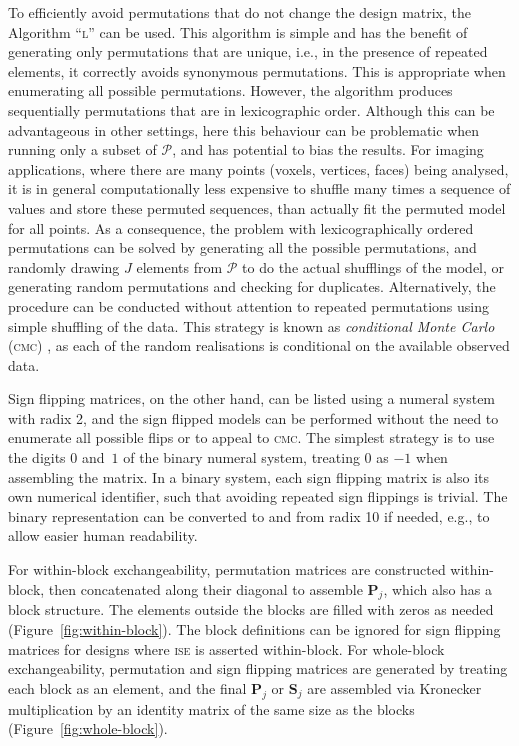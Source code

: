 To efficiently avoid permutations that do not change the design matrix, the Algorithm ``\textsc{l}'' \citep{Knuth2005} can be used. This algorithm is simple and has the benefit of generating only permutations that are unique, i.e., in the presence of repeated elements, it correctly avoids synonymous permutations. This is appropriate when enumerating all possible permutations. However, the algorithm produces sequentially permutations that are in lexicographic order. Although this can be advantageous in other settings, here this behaviour can be problematic when running only a subset of $\mathcal{P}$, and has potential to bias the results. For imaging applications, where there are many points (voxels, vertices, faces) being analysed, it is in general computationally less expensive to shuffle many times a sequence of values and store these permuted sequences, than actually fit the permuted model for all points. As a consequence, the problem with lexicographically ordered permutations can be solved by generating all the possible permutations, and randomly drawing $J$ elements from $\mathcal{P}$ to do the actual shufflings of the model,  or generating random permutations and checking for duplicates. Alternatively, the procedure can be conducted without attention to repeated permutations using simple shuffling of the data. This strategy is known as \emph{conditional Monte Carlo} (\textsc{cmc}) \citep{Trotter1956, Pesarin2010}, as each of the random realisations is conditional on the available observed data.

Sign flipping matrices, on the other hand, can be listed using a numeral system with radix 2, and the sign flipped models can be performed without the need to enumerate all possible flips or to appeal to \textsc{cmc}. The simplest strategy is to use the digits $0$ and~$1$ of the binary numeral system, treating 0 as $-1$ when assembling the matrix. In a binary system, each sign flipping matrix is also its own numerical identifier, such that avoiding repeated sign flippings is trivial. The binary representation can be converted to and from radix 10 if needed, e.g., to allow easier human readability.

For within-block exchangeability, permutation matrices are constructed within-block, then concatenated along their diagonal to assemble $\mathbf{P}_{j}$, which also has a block structure. The elements outside the blocks are filled with zeros as needed  (Figure~\ref{fig:within-block}). The block definitions can be ignored for sign flipping matrices for designs where \textsc{ise} is asserted within-block. For whole-block exchangeability, permutation and sign flipping matrices are generated by treating each block as an element, and the final $\mathbf{P}_{j}$ or $\mathbf{S}_{j}$ are assembled via Kronecker multiplication by an identity matrix of the same size as the blocks (Figure~\ref{fig:whole-block}).

